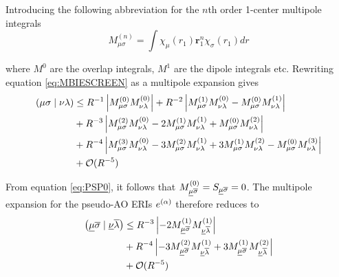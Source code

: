 \noindent Introducing the following abbreviation for the $n$th order 1-center multipole integrals
\begin{equation}
M^{(n)}_{\mu\sigma} = \int \chi_{\mu}(r_1) \mathbf{r}_1^n \chi_{\sigma}(r_1) dr
\end{equation}

\noindent where $M^{0}$ are the overlap integrals, $M^{1}$ are the dipole integrals etc. Rewriting equation \ref{eq:MBIESCREEN} as a multipole expansion gives
\newcommand{\mpole}[2]{M_{#1}^{(#2)}}
\begin{equation}
\begin{split}
\cn{\mu\sigma}{\nu\lambda} &\leq R^{-1} \left\lvert \mpole{\mu\sigma}{0} \mpole{\nu\lambda}{0} \right\rvert + R^{-2} \left\lvert \mpole{\mu\sigma}{1} \mpole{\nu\lambda}{0} - \mpole{\mu\sigma}{0} \mpole{\nu\lambda}{1} \right\rvert \\
&+ R^{-3} \left\lvert \mpole{\mu\sigma}{2} \mpole{\nu\lambda}{0} - 2 \mpole{\mu\sigma}{1} \mpole{\nu\lambda}{1} + \mpole{\mu\sigma}{0} \mpole{\nu\lambda}{2}\right\rvert \\
&+ R^{-4} \left\lvert \mpole{\mu\sigma}{3} \mpole{\nu\lambda}{0} - 3\mpole{\mu\sigma}{2} \mpole{\nu\lambda}{1} + 3\mpole{\mu\sigma}{1} \mpole{\nu\lambda}{2} - \mpole{\mu\sigma}{0} \mpole{\nu\lambda}{3}\right\rvert \\
&+ \mathcal{O}(R^{-5})
\end{split}
\end{equation}

\noindent From equation \ref{eq:PSP0}, it follows that $M_{\underline{\mu}\overline{\sigma}}^{(0)} = S_{\underline{\mu}\overline{\sigma}} = 0$. The multipole expansion for the pseudo-AO ERIs $e^{(\alpha)}$ therefore reduces to
\begin{equation}
\begin{split}
\cn{\ulgm\olgs}{\ulgn\olgl} &\leq R^{-3} \left\lvert - 2 \mpole{\ulgm\olgs}{1} \mpole{\ulgn\olgl}{1} \right\rvert \\
&+ R^{-4} \left\lvert - 3\mpole{\ulgm\olgs}{2} \mpole{\ulgn\olgl}{1} + 3\mpole{\ulgm\olgs}{1} \mpole{\ulgn\olgl}{2} \right\rvert \\
&+ \mathcal{O}(R^{-5})
\end{split}
\end{equation}

